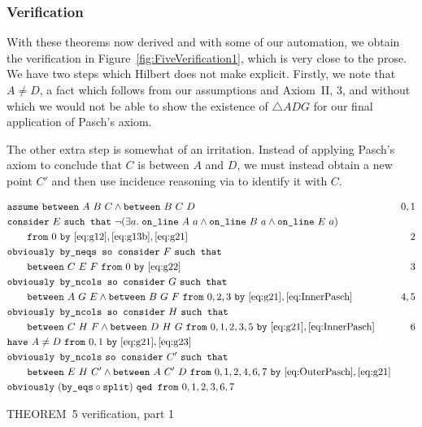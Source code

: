 \subsubsection{Verification}
With these theorems now derived and with some of our automation, we obtain the verification in Figure~\ref{fig:FiveVerification1}, which is very close to the prose. We have two steps which Hilbert does not make explicit. Firstly, we note that $A\neq D$, a fact which follows from our assumptions and Axiom~II, 3, and without which we would not be able to show the existence of $\triangle ADG$ for our final application of Pasch's axiom.

The other extra step is somewhat of an irritation. Instead of applying Pasch's axiom to conclude that $C$ is between $A$ and $D$, we must instead obtain a new point $C'$ and then use incidence reasoning via  to identify it with $C$. 

\begin{boxedfigure}
\small
  \begin{align*}
    &\code{assume}\ \between{A}{B}{C} \wedge \between{B}{C}{D} & 0,1\\
    &\code{consider}\ E\ \code{such that}\ \Triangle{a}{A}{B}{E}\\
    &\qquad\code{from}\ 0\ \code{by}\ \eqref{eq:g12},\eqref{eq:g13b},\eqref{eq:g21} & 2\\
    &\code{obviously by\_neqs so consider}\ F\ \code{such that}\\
    &\qquad\between{C}{E}{F}\ \code{from}\ 0\ \code{by}\ \eqref{eq:g22} & 3\\
    &\code{obviously by\_ncols so consider}\ G\ \code{such that}\\ 
    &\qquad\between{A}{G}{E} \wedge \between{B}{G}{F}\ \code{from}\ 0,2,3\ \code{by}\
    \eqref{eq:g21},\eqref{eq:InnerPasch}& 4,5\\    
    &\code{obviously by\_ncols so consider}\ H\ \code{such that}\\ 
    &\qquad\between{C}{H}{F} \wedge \between{D}{H}{G}\ \code{from}\ 0,1,2,3,5\ \code{by}\ \eqref{eq:g21},\eqref{eq:InnerPasch}& 6\\
    &\code{have}\ A\neq D\ \code{from}\ 0,1\ \code{by}\ \eqref{eq:g21},\eqref{eq:g23}\\
    &\code{obviously by\_ncols}\ \code{so consider}\ C'\ \code{such that}\\
    &\qquad\between{E}{H}{C'}\wedge\between{A}{C'}{D}\ \code{from}\ 0,1,2,4,6,7\ \code{by}\ \eqref{eq:OuterPasch},\eqref{eq:g21}\\
    &\code{obviously}\ (\code{by\_eqs}\circ\code{split})\ \code{qed from}\ 0,1,2,3,6,7
  \end{align*}
  \caption{THEOREM~5 verification, part 1}
  \label{fig:FiveVerification1}
\end{boxedfigure}

